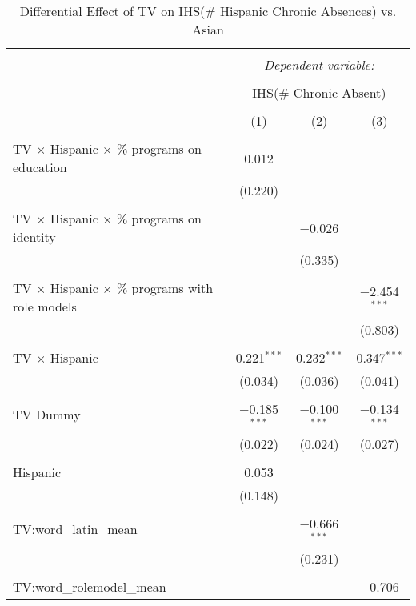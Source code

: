 
\begin{table}[!htbp] \centering 
  \caption{Differential Effect of TV on IHS(\# Hispanic Chronic Absences) vs. Asian} 
  \label{} 
\begin{tabular}{@{\extracolsep{-2pt}}lccc} 
\\[-1.8ex]\hline 
\hline \\[-1.8ex] 
 & \multicolumn{3}{c}{\textit{Dependent variable:}} \\ 
\cline{2-4} 
\\[-1.8ex] & \multicolumn{3}{c}{IHS(\# Chronic Absent)} \\ 
\\[-1.8ex] & (1) & (2) & (3)\\ 
\hline \\[-1.8ex] 
 TV $\times$ Hispanic $\times$ \% programs on education & 0.012 &  &  \\ 
  & (0.220) &  &  \\ 
  & & & \\ 
 TV $\times$ Hispanic $\times$ \% programs on identity &  & $-$0.026 &  \\ 
  &  & (0.335) &  \\ 
  & & & \\ 
 TV $\times$ Hispanic $\times$ \% programs with role models &  &  & $-$2.454$^{***}$ \\ 
  &  &  & (0.803) \\ 
  & & & \\ 
 TV $\times$ Hispanic & 0.221$^{***}$ & 0.232$^{***}$ & 0.347$^{***}$ \\ 
  & (0.034) & (0.036) & (0.041) \\ 
  & & & \\ 
 TV Dummy & $-$0.185$^{***}$ & $-$0.100$^{***}$ & $-$0.134$^{***}$ \\ 
  & (0.022) & (0.024) & (0.027) \\ 
  & & & \\ 
 Hispanic & 0.053 &  &  \\ 
  & (0.148) &  &  \\ 
  & & & \\ 
 TV:word\_latin\_mean &  & $-$0.666$^{***}$ &  \\ 
  &  & (0.231) &  \\ 
  & & & \\ 
 TV:word\_rolemodel\_mean &  &  & $-$0.706 \\ 

\end{tabular}
\end{table}
